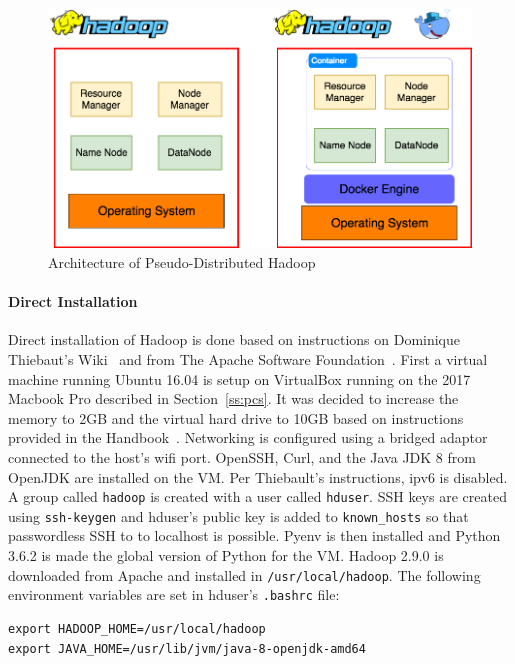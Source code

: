 \begin{figure}[!ht]
	\centering\includegraphics[width=\columnwidth]{images/hadoop-docker-pseudo.png}
	\caption{Architecture of Pseudo-Distributed 
	Hadoop}\label{f:hadoop-pseudo}
\end{figure}

\paragraph{Direct Installation}
Direct installation of Hadoop is done based on instructions on
Dominique Thiebaut's Wiki~\cite{hid-sp18-419-Thiebaut} and from The
Apache Software
Foundation~\cite{hid-sp18-419-Apache-single-node}. First a virtual
machine running Ubuntu 16.04 is setup on VirtualBox running on the
2017 Macbook Pro described in Section~\ref{ss:pcs}. It was decided to
increase the memory to 2GB and the virtual hard drive to 10GB based on
instructions provided in the Handbook~\cite{las18handbook}. Networking
is configured using a bridged adaptor connected to the host's wifi
port. OpenSSH, Curl, and the Java JDK 8 from OpenJDK are installed on
the VM. Per Thiebault's instructions, ipv6 is disabled. A group
called \verb|hadoop| is created with a user called \verb|hduser|. SSH
keys are created using \verb|ssh-keygen| and hduser's public key is
added to \verb|known_hosts| so that passwordless SSH to to localhost
is possible. Pyenv is then installed and Python 3.6.2 is made the
global version of Python for the VM. Hadoop 2.9.0 is downloaded from
Apache and installed in \verb|/usr/local/hadoop|. The following
environment variables are set in hduser's \verb|.bashrc| file:
\begin{verbatim}
export HADOOP_HOME=/usr/local/hadoop
export JAVA_HOME=/usr/lib/jvm/java-8-openjdk-amd64
\end{verbatim}

